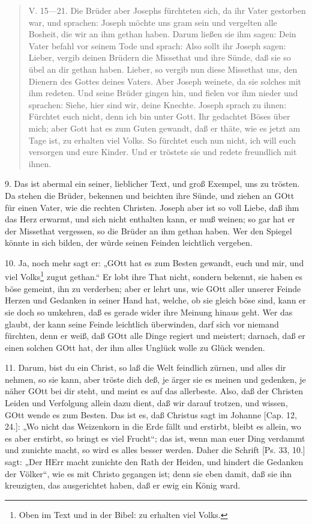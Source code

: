 \begin{quote}
V. 15—21. Die Brüder aber Josephs fürchteten sich, da ihr Vater gestorben war, und sprachen: Joseph möchte uns gram sein und vergelten alle Bosheit, die wir an ihm gethan haben. Darum ließen sie ihm sagen: Dein Vater befahl vor seinem Tode und sprach: Also sollt ihr Joseph sagen: Lieber, vergib deinen Brüdern die Missethat und ihre Sünde, daß sie so übel an dir gethan haben. Lieber, so vergib nun diese Missethat uns, den Dienern des Gottes deines Vaters. Aber Joseph weinete, da sie solches mit ihm redeten. Und seine Brüder gingen hin, und fielen vor ihm nieder und sprachen: Siehe, hier sind wir, deine Knechte. Joseph sprach zu ihnen: Fürchtet euch nicht, denn ich bin unter Gott. Ihr gedachtet Böses über mich; aber Gott hat es zum Guten gewandt, daß er thäte, wie es jetzt am Tage ist, zu erhalten viel Volks. So fürchtet euch nun nicht, ich will euch versorgen und eure Kinder. Und er tröstete sie und redete freundlich mit ihnen.
\end{quote}

9. Das ist abermal ein seiner, lieblicher Text, und groß Exempel, uns zu trösten. Da stehen die Brüder, bekennen und beichten ihre Sünde,
und ziehen an GOtt für einen Vater, wie die rechten Christen. Joseph aber ist so voll Liebe, daß ihm das Herz erwarmt, und sich nicht enthalten kann, er muß weinen; so gar hat er der Missethat vergessen, so die Brüder an ihm gethan haben. Wer den Spiegel könnte in sich bilden, der würde seinen Feinden leichtlich vergeben.

10. Ja, noch mehr sagt er: „GOtt hat es zum Besten gewandt, euch und mir, und viel Volks\footnote{Oben im Text und in der Bibel: zu erhalten viel Volks.} zugut gethan.“ Er lobt ihre That nicht, sondern bekennt, sie haben es böse gemeint, ihn zu verderben; aber er lehrt uns, wie GOtt aller unserer Feinde Herzen und Gedanken in seiner Hand hat, welche, ob sie gleich böse sind, kann er sie doch so umkehren, daß es gerade wider ihre Meinung hinaus geht. Wer das glaubt, der kann seine Feinde leichtlich überwinden, darf sich vor niemand fürchten, denn er weiß, daß GOtt alle Dinge regiert und meistert; darnach, daß er einen solchen GOtt hat, der ihm alles Unglück wolle zu Glück wenden.

11. Darum, bist du ein Christ, so laß die Welt feindlich zürnen, und alles dir nehmen, so sie kann, aber tröste dich deß, je ärger sie es meinen und gedenken, je näher GOtt bei dir steht, und meint es auf das allerbeste. Also, daß der Christen Leiden und Verfolgung allein dazu dient, daß wir darauf trotzen, und wissen, GOtt wende es zum Besten. Das ist es, daß Christus sagt im Johanne [Cap. 12, 24.]: „Wo nicht das Weizenkorn in die Erde fällt und erstirbt, bleibt es allein, wo es aber erstirbt, so bringt es viel Frucht“; das ist, wenn man euer Ding verdammt und zunichte macht, so wird es alles besser werden. Daher die Schrift [Ps. 33, 10.] sagt: „Der HErr macht zunichte den Rath der Heiden, und hindert die Gedanken der Völker“, wie es mit Christo gegangen ist; denn sie eben damit, daß sie ihn kreuzigten, das ausgerichtet haben, daß er ewig ein König ward.

